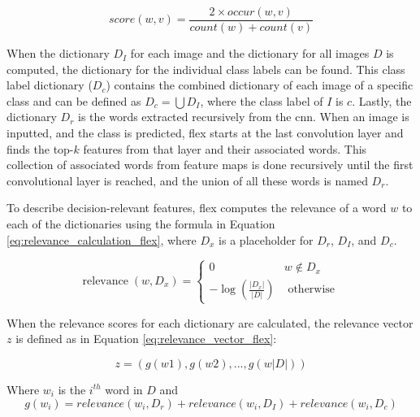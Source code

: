         \begin{equation}
            \textit{score}(w, v) = \frac{2 \times \textit{occur}(w, v)}{\textit{count}(w) + \textit{count}(v)}
        \label{eq:dice_score_flex}
        \end{equation}

        When the dictionary $D_I$ for each image and the dictionary for all images $D$ is computed, the dictionary for the individual class labels can be found. This class label dictionary ($D_c$) contains the combined dictionary of each image of a specific class and can be defined as $D_c = \bigcup D_I$, where the class label of $I$ is $c$. 
        Lastly, the dictionary $D_r$ is the words extracted recursively from the \gls{cnn}. When an image is inputted, and the class is predicted, \gls{flex} starts at the last convolution layer and finds the top-$k$ features from that layer and their associated words. This collection of associated words from feature maps is done recursively until the first convolutional layer is reached, and the union of all these words is named $D_r$.


        To describe decision-relevant features, \gls{flex} computes the relevance of a word $w$ to each of the dictionaries using the formula in Equation \ref{eq:relevance_calculation_flex}, where $D_x$ is a placeholder for $D_r$, $D_I$, and $D_c$.

        \begin{equation}
            \operatorname{relevance}\left(w, D_x\right)=\left\{\begin{array}{cl}
            0 & w \notin D_x \\
            -\log \left(\frac{\left|D_x\right|}{|D|}\right) & \text { otherwise }
            \end{array}\right.
            \label{eq:relevance_calculation_flex}
        \end{equation}

        When the relevance scores for each dictionary are calculated, the relevance vector $z$ is defined as in Equation \ref{eq:relevance_vector_flex}:

        \begin{equation}
            z = (g(w1), g(w2), ..., g(w\left|D\right|))
        \label{eq:relevance_vector_flex}
        \end{equation}

        Where $w_i$ is the $i^{th}$ word in $D$ and
        \begin{equation*}
            g(w_i) = relevance(w_i, D_r) + relevance(w_i, D_I ) + relevance(w_i, D_c)
        \end{equation*}
  

